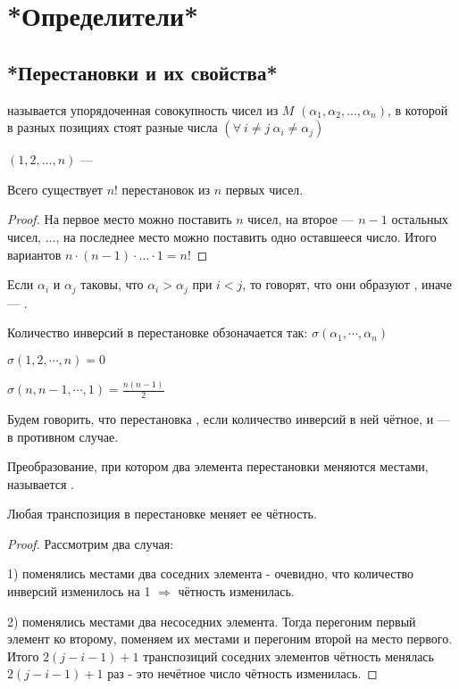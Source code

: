 \chapter{*Определители*}
\section{*Перестановки и их свойства*}
\begin{opred}
 называется упорядоченная совокупность чисел из $M$ $(\alpha_1,\alpha_2,\ldots,\alpha_n)$, в которой в разных позициях стоят разные числа $(\forall\ i\neq{}j\ \alpha_i\neq{}\alpha_j)$

$(1,2,\ldots,n)$ --- 
\end{opred}
\begin{theor}
Всего существует $n!$ перестановок из $n$ первых чисел.
\end{theor}
\begin{proof}
На первое место можно поставить $n$ чисел, на второе --- $n-1$ остальных чисел, $\ldots$, на последнее место можно поставить одно оставшееся число. Итого вариантов $n\cdot(n-1)\cdot\ldots\cdot1=n!$
\end{proof}
\begin{opred}
Если $\alpha_i$ и $\alpha_j$ таковы, что $\alpha_i>\alpha_j$ при $i<j$, то говорят, что они образуют , иначе --- .

Количество инверсий в перестановке обзоначается так: $\sigma(\alpha_1,\cdots,\alpha_n)$

$\sigma(1,2,\cdots,n)=0$

$\sigma(n,n-1,\cdots,1)=\frac{n(n-1)}2$
\end{opred}
\begin{opred}
Будем говорить, что перестановка , если количество инверсий в ней чётное, и \newline{} --- в противном случае.
\end{opred}
\begin{opred}
Преобразование, при котором два элемента перестановки меняются местами, называется .
\end{opred}
\begin{theor}
Любая транспозиция в перестановке меняет ее чётность.
\end{theor}
\begin{proof}
Рассмотрим два случая:

1) поменялись местами два соседних элемента - очевидно, что количество инверсий изменилось на 1 $\Rightarrow$ чётность изменилась.

2) поменялись местами два несоседних элемента. Тогда перегоним первый элемент ко второму, поменяем их местами и перегоним второй на место первого. Итого $2(j-i-1)+1$ транспозиций соседних элементов \then чётность менялась $2(j-i-1)+1$ раз - это нечётное число \then чётность изменилась.
\end{proof}
